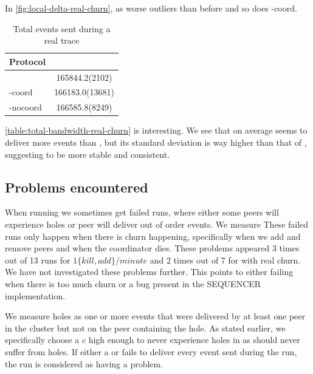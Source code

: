 In \autoref{fig:local-delta-real-churn}, \epto as worse outliers than before and so does \jgroups-coord.
\begin{table}[hpt]
	\centering
	\caption{Total events sent during a real trace}
\begin{tabular}{lS}
	\toprule
	Protocol &\\
	\midrule
	\epto & 165844.2(2102)\\
	\jgroups-coord & 166183.0(13681)\\
	\jgroups-nocoord & 166585.8(8249)\\
	\bottomrule
\end{tabular}
    \label{table:total-sent-real-churn}
\end{table}
\autoref{table:total-bandwidth-real-churn} is interesting. We see that on average \jgroups seems to deliver more events than \epto, but its standard deviation is way higher than that of \epto, suggesting \epto to be more stable and consistent.
\subsection{Problems encountered}
When running \jgroups we sometimes get failed runs, where either some peers will experience holes or peer will deliver out of order events. We measure  These failed runs only happen when there is churn happening, specifically when we add and remove peers and when the coordinator dies. These problems appeared 3 times out of 13 runs for \jgroups $1\{kill,add\}/minute$ and 2 times out of 7 for \jgroups with real churn. We have not investigated these problems further. This points to either \jgroups failing when there is too much churn or a bug present in the SEQUENCER implementation.

We measure holes as one or more events that were delivered by at least one peer in the cluster but not on the peer containing the hole. As stated earlier, we specifically choose a $c$ high enough to never experience holes in \epto as \jgroups should never suffer from holes. If either a \jgroups or \epto fails to deliver every event sent during the run, the run is considered as having a problem.

